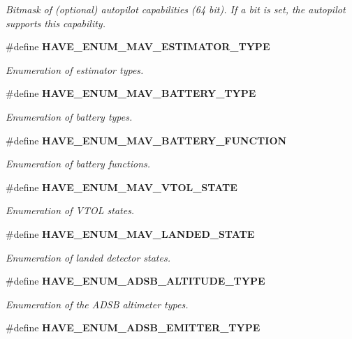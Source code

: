 \begin{DoxyCompactItemize}
\begin{DoxyCompactList}\small\item\em Bitmask of (optional) autopilot capabilities (64 bit). If a bit is set, the autopilot supports this capability. \end{DoxyCompactList}\item 
\#define \textbf{ H\+A\+V\+E\+\_\+\+E\+N\+U\+M\+\_\+\+M\+A\+V\+\_\+\+E\+S\+T\+I\+M\+A\+T\+O\+R\+\_\+\+T\+Y\+PE}
\begin{DoxyCompactList}\small\item\em Enumeration of estimator types. \end{DoxyCompactList}\item 
\#define \textbf{ H\+A\+V\+E\+\_\+\+E\+N\+U\+M\+\_\+\+M\+A\+V\+\_\+\+B\+A\+T\+T\+E\+R\+Y\+\_\+\+T\+Y\+PE}
\begin{DoxyCompactList}\small\item\em Enumeration of battery types. \end{DoxyCompactList}\item 
\#define \textbf{ H\+A\+V\+E\+\_\+\+E\+N\+U\+M\+\_\+\+M\+A\+V\+\_\+\+B\+A\+T\+T\+E\+R\+Y\+\_\+\+F\+U\+N\+C\+T\+I\+ON}
\begin{DoxyCompactList}\small\item\em Enumeration of battery functions. \end{DoxyCompactList}\item 
\#define \textbf{ H\+A\+V\+E\+\_\+\+E\+N\+U\+M\+\_\+\+M\+A\+V\+\_\+\+V\+T\+O\+L\+\_\+\+S\+T\+A\+TE}
\begin{DoxyCompactList}\small\item\em Enumeration of V\+T\+OL states. \end{DoxyCompactList}\item 
\#define \textbf{ H\+A\+V\+E\+\_\+\+E\+N\+U\+M\+\_\+\+M\+A\+V\+\_\+\+L\+A\+N\+D\+E\+D\+\_\+\+S\+T\+A\+TE}
\begin{DoxyCompactList}\small\item\em Enumeration of landed detector states. \end{DoxyCompactList}\item 
\#define \textbf{ H\+A\+V\+E\+\_\+\+E\+N\+U\+M\+\_\+\+A\+D\+S\+B\+\_\+\+A\+L\+T\+I\+T\+U\+D\+E\+\_\+\+T\+Y\+PE}
\begin{DoxyCompactList}\small\item\em Enumeration of the A\+D\+SB altimeter types. \end{DoxyCompactList}\item 
\#define \textbf{ H\+A\+V\+E\+\_\+\+E\+N\+U\+M\+\_\+\+A\+D\+S\+B\+\_\+\+E\+M\+I\+T\+T\+E\+R\+\_\+\+T\+Y\+PE}

\end{DoxyCompactItemize}
